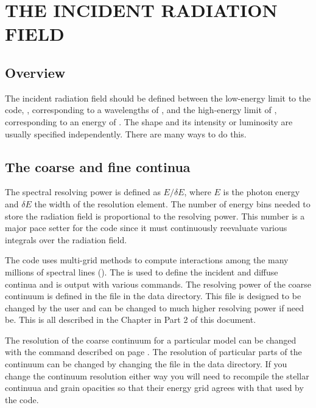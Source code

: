 \chapter{THE INCIDENT RADIATION FIELD}

\section{Overview}

The incident radiation field should be defined between the low-energy limit
to the code, \emm , corresponding to a wavelengths of \emmcm ,
and the high-energy limit of \egamry , corresponding to an energy of \egamrymev .
The shape and its intensity or luminosity are usually specified
independently.
There are many ways to do this.

\section{The coarse and fine continua}

The spectral resolving power is defined as $E/\delta E$, where $E$ is the
photon energy and $\delta E$ the width of the resolution element.  The number
of energy bins needed to store the radiation field is proportional to the
resolving power.  This number is a major pace setter for the code since it
must continuously reevaluate various integrals over the radiation field.

The code uses multi-grid methods to compute interactions among the
many millions of spectral lines (\citealp{Shaw2005}).  The
 is used to define the
incident and diffuse continua and
is output with various  commands.
The resolving power of the
coarse continuum is defined in the file 
in the data directory.
This file is designed to be changed by the user and can be
changed to much higher resolving power if need be.  This is all described in
the Chapter  in Part 2 of this document.

The resolution of the coarse continuum for a particular model can be changed with the 
 command described on 
page \pageref{sec:CommandSetContinuumOptions}.
The resolution of particular parts of the continuum can be changed by
changing the file 
in the data directory.
If you change the continuum resolution either way you will need to recompile
the stellar continuua and grain opacities so that their energy grid
agrees with that used by the code.

